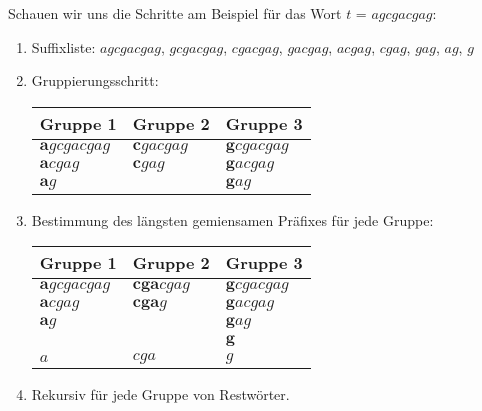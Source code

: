 \documentclass[12pt]{report}
\begin{document}
Schauen wir uns die Schritte am Beispiel für das Wort $t$ = $agcgacgag$:
\begin{enumerate}
    \item Suffixliste: $agcgacgag$, $gcgacgag$, $cgacgag$, $gacgag$, $acgag$, $cgag$, $gag$, $ag$, $g$
    \item Gruppierungsschritt:
        \begin{center}
        \begin{tabular}{l l l}
            \toprule
            Gruppe 1                 & Gruppe 2               & Gruppe 3                \\
            \midrule
            $\boldsymbol{a}gcgacgag$ & $\boldsymbol{c}gacgag$ & $\boldsymbol{g}cgacgag$ \\
            $\boldsymbol{a}cgag$     & $\boldsymbol{c}gag$    & $\boldsymbol{g}acgag$   \\
            $\boldsymbol{a}g$        &                        & $\boldsymbol{g}ag$      \\
            \bottomrule
        \end{tabular}
        \end{center}
    \item Bestimmung des längsten gemiensamen Präfixes für jede Gruppe:
        \begin{center}
        \begin{tabular}{l l l}
            \toprule
            Gruppe 1                 & Gruppe 2               & Gruppe 3                \\
            \midrule
            $\boldsymbol{a}gcgacgag$ & $\boldsymbol{cga}cgag$ & $\boldsymbol{g}cgacgag$ \\
            $\boldsymbol{a}cgag$     & $\boldsymbol{cga}g$    & $\boldsymbol{g}acgag$   \\
            $\boldsymbol{a}g$        &                        & $\boldsymbol{g}ag$      \\
                                     &                        & $\boldsymbol{g}$        \\
            \midrule
            $a$                      & $cga$                  & $g$                     \\
            \bottomrule
        \end{tabular}
        \end{center}
    \item Rekursiv für jede Gruppe von Restwörter.
\end{enumerate}
\end{document}
